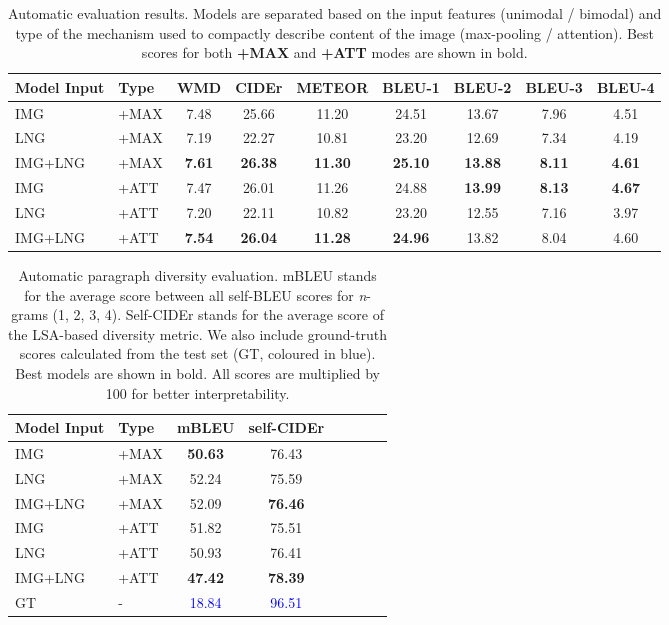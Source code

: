 \documentclass[11pt,a4paper]{article}
\begin{document}
\begin{table}[h]
   \footnotesize
  \centering
  \begin{tabular}{|l|l|c|c|c|c|c|c|c|}
  \hline
    \textbf{Model Input} & \textbf{Type} & \textbf{WMD} & \textbf{CIDEr}  & \textbf{METEOR} & \textbf{BLEU-1} & \textbf{BLEU-2}
    & \textbf{BLEU-3} & \textbf{BLEU-4}  \\
  \hline
   IMG & +MAX & 7.48 & 25.66 & 11.20 & 24.51 & 13.67 & 7.96 &  4.51 \\
  \hline
   LNG & +MAX & 7.19 & 22.27 & 10.81 & 23.20 & 12.69 & 7.34 & 4.19\\
  \hline
   IMG+LNG & +MAX & \textbf{7.61} &  \textbf{26.38} &   \textbf{11.30} &  \textbf{25.10} &   \textbf{13.88} &   \textbf{8.11} &   \textbf{4.61}  \\
  \hline
   IMG & +ATT & 7.47 & 26.01& 11.26 & 24.88 &   \textbf{13.99} &  \textbf{8.13} &   \textbf{4.67}  \\
  \hline
   LNG & +ATT & 7.20 & 22.11 & 10.82 & 23.20 & 12.55 & 7.16 & 3.97  \\
  \hline
   IMG+LNG & +ATT & \textbf{7.54} &  \textbf{26.04} &  \textbf{11.28} & \textbf{24.96} & 13.82 & 8.04 & 4.60 \\
     \hline
  \end{tabular}
    \caption{
    Automatic evaluation results. Models are separated based on the input features (unimodal / bimodal) and type of the mechanism used to compactly describe content of the image (max-pooling / attention).
    Best scores for both \textbf{+MAX} and \textbf{+ATT} modes are shown in bold.
    }
  \label{tab:accstats}
\end{table}


\begin{table}[h]
   \footnotesize
  \centering
  \begin{tabular}{|l|l|c|c|c|c|c|c|}
  \hline
    \textbf{Model Input} & \textbf{Type} & \textbf{mBLEU} & \textbf{self-CIDEr}  \\
  \hline
   IMG & +MAX & \textbf{50.63} & 76.43 \\
  \hline
   LNG & +MAX & 52.24 & 75.59 \\
  \hline
   IMG+LNG & +MAX & 52.09 & \textbf{76.46}  \\
  \hline
  \hline
   IMG & +ATT & 51.82 & 75.51  \\
  \hline
   LNG & +ATT & 50.93 & 76.41  \\
  \hline
   IMG+LNG & +ATT & \textbf{47.42} & \textbf{78.39} \\
  \hline
  \hline
   GT & - & \textcolor{blue}{18.84} & \textcolor{blue}{96.51} \\
  \hline
  \end{tabular}
  \caption{Automatic paragraph diversity evaluation. mBLEU stands for the average score between all self-BLEU scores for \textit{n}-grams (1, 2, 3, 4). Self-CIDEr stands for the average score of the LSA-based diversity metric. We also include ground-truth scores calculated from the test set (GT, coloured in blue). Best models are shown in bold. All scores are multiplied by 100 for better interpretability.}
  \label{tab:divstats}
\end{table}
\end{document}
